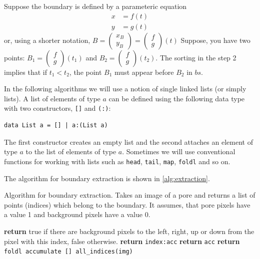 \documentclass[reprint,amsmath,amssymb,aps,pre,showkeys,showpacs]{revtex4-1}
\begin{document}
Suppose the boundary is defined by a parameteric equation
\begin{equation*}
  \begin{aligned}
    x &= f(t) \\
    y &= g(t)
  \end{aligned}
\end{equation*}
or, using a shorter notation,
$B = \begin{pmatrix} x_B \\ y_B \end{pmatrix} = \begin{pmatrix} f \\ g \end{pmatrix}(t)$
Suppose, you have two points: $B_1 = \begin{pmatrix} f \\ g \end{pmatrix}(t_1)$
and $B_2 = \begin{pmatrix} f \\ g \end{pmatrix}(t_2)$. The sorting in the step 2
implies that if $t_1 < t_2$, the point $B_1$ must appear before $B_2$ in $bs$.

In the following algorithms we will use a notion of single linked lists (or
simply lists). A list of elements of type $a$ can be defined using the following
data type with two constructors, \texttt{[]} and \texttt{(:)}:
\begin{verbatim}
data List a = [] | a:(List a)
\end{verbatim}
The first constructor creates an empty list and the second attaches an element
of type $a$ to the list of elements of type $a$. Sometimes we will use
conventional functions for working with lists such as \texttt{head},
\texttt{tail}, \texttt{map}, \texttt{foldl} and so on.

The algorithm for boundary extraction is shown in \cref{alg:extraction}.
\begin{algorithm}[H]
  \caption{Algorithm for boundary extraction. Takes an image of a pore and
    returns a list of points (indices) which belong to the boundary. It assumes,
  that pore pixels have a value 1 and background pixels have a value 0.}
  \label{alg:extraction}
  \begin{algorithmic}[1]
    \State \textbf{return} true if there are background pixels to the left,
    right, up or down from the pixel with this index, false otherwise.
    \EndProcedure
    \State \textbf{return} \texttt{index:acc}
    \Else
    \State \textbf{return} \texttt{acc}
    \EndIf
    \EndProcedure
    \State \textbf{return} \texttt{foldl accumulate [] all\_indices(img)}
    \EndProcedure
  \end{algorithmic}
\end{algorithm}
\end{document}
